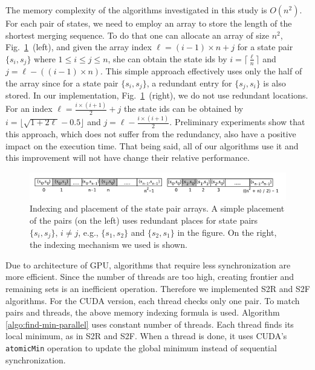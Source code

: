 \documentclass[12pt]{article}
\begin{document}
The memory complexity of the algorithms investigated in this study is $O(n^2)$. For each pair of states, we need to employ an array to store the length of the shortest merging sequence. To do that one can allocate an array of size $n^2$, Fig.~\ref{fig:mem}~(left), and given the array index $\ell = (i-1) \times n + j$ for a state pair $\{s_i, s_j\}$ where $1  \leq i \leq j \leq n$, she can obtain the state ids by $i = \lceil{\frac{\ell}{n}} \rceil$  and $j =\ell - ((i -1) \times n)$. This simple approach effectively uses only the half of the array since for a state pair $\{s_i, s_j\}$, a redundant entry for $\{s_j, s_i\}$ is also stored. In our implementation, Fig.~\ref{fig:mem}~(right), we do not use redundant locations. For an index  $\ell = \frac{i \times (i+1)}{2} + j$ the state ids can be obtained by $i = \lfloor \sqrt{1 + 2\ell} - 0.5\rfloor$ and $j = \ell - \frac{i \times (i+1)}{2}$. Preliminary experiments show that this approach, which does not suffer from the redundancy,  also have a positive impact on the execution time. That being said, all of our algorithms use it and this improvement will not have change their relative performance.

\begin{figure}
	\centering
	\includegraphics[width=\textwidth]{figs/memory.pdf}
	\caption{Indexing and placement of the state pair arrays. A simple placement of the pairs (on the left) uses redundant places for state pairs $\{s_i, s_j\}$, $i \neq j$, e.g., $\{s_1, s_2\}$ and $\{s_2, s_1\}$ in the figure. On the right, the indexing mechanism we used is shown.}
	\label{fig:mem}
\end{figure}

Due to architecture of GPU, algorithms that require less synchronization are more efficient. Since the number of threads are too high, creating frontier and remaining sets is an inefficient operation. Therefore we implemented S2R and S2F algorithms. For the CUDA version, each thread checks only one pair. To match pairs and threads, the above memory indexing formula is used.  Algorithm \ref{algo:find-min-parallel} uses constant number of threads. Each thread finds its local minimum, as in S2R and S2F. 
When a thread is done, it uses CUDA's {\tt atomicMin} operation to update the global minimum instead of sequential synchronization. 
\end{document}
